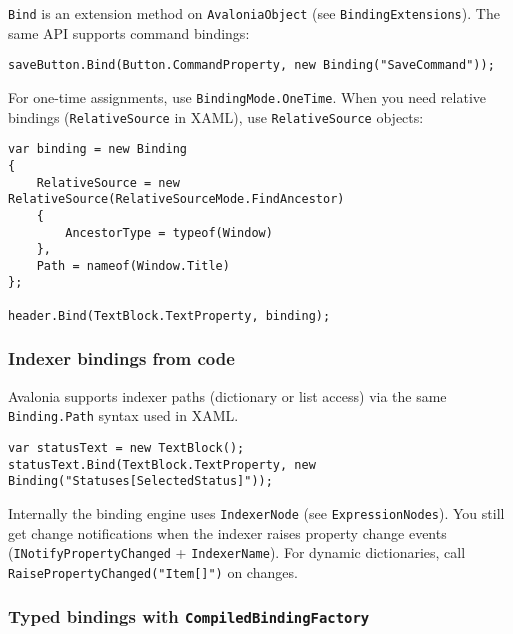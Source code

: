 \passthrough{\lstinline!Bind!} is an extension method on
\passthrough{\lstinline!AvaloniaObject!} (see
\passthrough{\lstinline!BindingExtensions!}). The same API supports
command bindings:

\begin{lstlisting}
saveButton.Bind(Button.CommandProperty, new Binding("SaveCommand"));
\end{lstlisting}

For one-time assignments, use
\passthrough{\lstinline!BindingMode.OneTime!}. When you need relative
bindings (\passthrough{\lstinline!RelativeSource!} in XAML), use
\passthrough{\lstinline!RelativeSource!} objects:

\begin{lstlisting}
var binding = new Binding
{
    RelativeSource = new RelativeSource(RelativeSourceMode.FindAncestor)
    {
        AncestorType = typeof(Window)
    },
    Path = nameof(Window.Title)
};

header.Bind(TextBlock.TextProperty, binding);
\end{lstlisting}

\subsubsection{Indexer bindings from
code}\label{indexer-bindings-from-code}

Avalonia supports indexer paths (dictionary or list access) via the same
\passthrough{\lstinline!Binding.Path!} syntax used in XAML.

\begin{lstlisting}
var statusText = new TextBlock();
statusText.Bind(TextBlock.TextProperty, new Binding("Statuses[SelectedStatus]"));
\end{lstlisting}

Internally the binding engine uses \passthrough{\lstinline!IndexerNode!}
(see \passthrough{\lstinline!ExpressionNodes!}). You still get change
notifications when the indexer raises property change events
(\passthrough{\lstinline!INotifyPropertyChanged!} +
\passthrough{\lstinline!IndexerName!}). For dynamic dictionaries, call
\passthrough{\lstinline!RaisePropertyChanged("Item[]")!} on changes.

\subsubsection{\texorpdfstring{Typed bindings with
\texttt{CompiledBindingFactory}}{Typed bindings with CompiledBindingFactory}}\label{typed-bindings-with-compiledbindingfactory}

